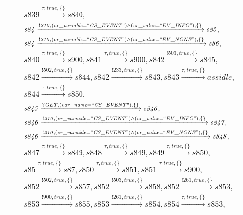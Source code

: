 \begin{tabular}{lcl}
& & $\mathit{s839}\xrightarrow{\mathit{\tau}, \mathit{true}, \{\}}\mathit{s840},$ \\
& & $\mathit{s84}\xrightarrow{\mathit{!210}, \mathit{(cr\_variable = ``CS\_EVENT") \land (cr\_value = ``EV\_INFO")}, \{\}}\mathit{s85},$ \\
& & $\mathit{s84}\xrightarrow{\mathit{!210}, \mathit{(cr\_variable = ``CS\_EVENT") \land (cr\_value = ``EV\_NONE")}, \{\}}\mathit{s86},$ \\
& & $\mathit{s840}\xrightarrow{\mathit{\tau}, \mathit{true}, \{\}}\mathit{s900},\mathit{s841}\xrightarrow{\mathit{\tau}, \mathit{true}, \{\}}\mathit{s900},\mathit{s842}\xrightarrow{\mathit{!503}, \mathit{true}, \{\}}\mathit{s845},$ \\
& & $\mathit{s842}\xrightarrow{\mathit{!502}, \mathit{true}, \{\}}\mathit{s844},\mathit{s842}\xrightarrow{\mathit{!233}, \mathit{true}, \{\}}\mathit{s843},\mathit{s843}\xrightarrow{\mathit{\tau}, \mathit{true}, \{\}}\mathit{assidle},$ \\
& & $\mathit{s844}\xrightarrow{\mathit{\tau}, \mathit{true}, \{\}}\mathit{s850},$ \\
& & $\mathit{s845}\xrightarrow{\mathit{?GET}, \mathit{(var\_name = ``CS\_EVENT")}, \{\}}\mathit{s846},$ \\
& & $\mathit{s846}\xrightarrow{\mathit{!210}, \mathit{(cr\_variable = ``CS\_EVENT") \land (cr\_value = ``EV\_INFO")}, \{\}}\mathit{s847},$ \\
& & $\mathit{s846}\xrightarrow{\mathit{!210}, \mathit{(cr\_variable = ``CS\_EVENT") \land (cr\_value = ``EV\_NONE")}, \{\}}\mathit{s848},$ \\
& & $\mathit{s847}\xrightarrow{\mathit{\tau}, \mathit{true}, \{\}}\mathit{s849},\mathit{s848}\xrightarrow{\mathit{\tau}, \mathit{true}, \{\}}\mathit{s849},\mathit{s849}\xrightarrow{\mathit{\tau}, \mathit{true}, \{\}}\mathit{s850},$ \\
& & $\mathit{s85}\xrightarrow{\mathit{\tau}, \mathit{true}, \{\}}\mathit{s87},\mathit{s850}\xrightarrow{\mathit{\tau}, \mathit{true}, \{\}}\mathit{s851},\mathit{s851}\xrightarrow{\mathit{\tau}, \mathit{true}, \{\}}\mathit{s900},$ \\
& & $\mathit{s852}\xrightarrow{\mathit{!502}, \mathit{true}, \{\}}\mathit{s857},\mathit{s852}\xrightarrow{\mathit{!503}, \mathit{true}, \{\}}\mathit{s858},\mathit{s852}\xrightarrow{\mathit{!261}, \mathit{true}, \{\}}\mathit{s853},$ \\
& & $\mathit{s853}\xrightarrow{\mathit{!900}, \mathit{true}, \{\}}\mathit{s855},\mathit{s853}\xrightarrow{\mathit{!261}, \mathit{true}, \{\}}\mathit{s854},\mathit{s854}\xrightarrow{\mathit{\tau}, \mathit{true}, \{\}}\mathit{s853},$ \\

\end{tabular}
